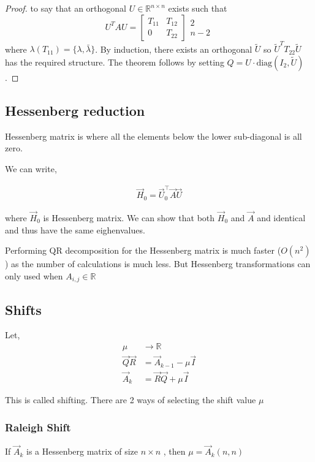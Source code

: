 \documentclass[journal]{IEEEtran}
\numberwithin{equation}{section}
\begin{document}
\begin{proof}
to say that an orthogonal \(U \in \mathbb{R}^{n \times n}\) exists such that
$$
U^T A U = \begin{bmatrix} T_{11} & T_{12} \\ 0 & T_{22} \end{bmatrix} \begin{array}{c} 2 \\ n-2 \end{array}
$$
where \(\lambda(T_{11}) = \{\lambda, \bar{\lambda}\}\). By induction, there exists an orthogonal \(\tilde{U}\) so \(\tilde{U}^T T_{22} \tilde{U}\) has the required structure. The theorem follows by setting \(Q = U \cdot \text{diag}(I_2, \tilde{U})\).
\end{proof}
\subsection{Hessenberg reduction}

Hessenberg matrix is where all the elements below the lower sub-diagonal is all zero.

We can write, 

\begin{align}
    \vec{H}_0 = \vec{U}^\top_0\vec{A}\vec{U}
\end{align}

where $\vec{H}_0$ is Hessenberg matrix. We can show that both $\vec{H}_0$ and $\vec{A}$ and identical and thus have the same eighenvalues. 

Performing QR decomposition for the Hessenberg matrix is much faster ($O(n^2)$) as the number of calculations is much less. 
But Hessenberg transformations can only used when $A_{i,j} \in \mathbb{R}$
\subsection{Shifts}
Let,
\begin{align}
    \mu &\to \mathbb{R}\\
    \vec{Q}\vec{R} &= \vec{A}_{k-1} - \mu\vec{I}\\
    \vec{A}_k &= \vec{R}\vec{Q} + \mu\vec{I}
\end{align}

This is called shifting. There are 2 ways of selecting the shift value $\mu$
\subsubsection{Raleigh Shift} If $\vec{A}_k$ is a Hessenberg matrix of size $n \times n$ , then $\mu = \vec{A}_k(n,n)$
\end{document}
